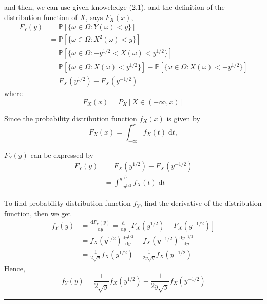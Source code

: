 \documentclass[twoside]{article}
\theoremstyle{definition}
\theoremstyle{remark}
\newenvironment{sol}{{\bf Solution:}}{\hfill\rule{2mm}{2mm}}
\begin{document}
\begin{enumerate}
\begin{sol}
    and then, we can use given knoweledge (2.1), and the definition of the
    distribution function of $X$, says $F_X(x)$,
    \begin{equation}
      \begin{split}
        F_Y(y)
        &= \mathbb{P}[{\{\omega \in \Omega : Y(\omega) < y \}}] \\
        &= \mathbb{P}[{\{\omega \in \Omega : X^2(\omega) < y \}}] \\
        &= \mathbb{P}[{\{\omega \in \Omega : -y^{1/2} < X(\omega) < y^{1/2} \}}] \\
        &= \mathbb{P}[{\{\omega \in \Omega : X(\omega) <  y^{1/2} \}}]
        -  \mathbb{P}[{\{\omega \in \Omega : X(\omega) < -y^{1/2} \}}] \\
        &= F_X(y^{1/2}) - F_X(y^{-1/2})
      \end{split}
    \end{equation}
    where
    \begin{equation}
      F_X(x) = P_X[X \in (-\infty, x)]
    \end{equation}

    Since the probability distribution function $f_X(x)$ is given by
    \begin{equation}
      F_X(x) = \int_{-\infty}^{x} f_X(t) \;\mathrm{d}t,
    \end{equation}

    $F_Y(y)$ can be expressed by
    \begin{equation}
      \begin{split}
        F_Y(y)
        &= F_X(y^{1/2}) - F_X(y^{-1/2}) \\
        &= \int_{-y^{1/2}}^{y^{1/2}} f_X(t) \;\mathrm{d}t
      \end{split}
    \end{equation}

    To find probability distribution function $f_Y$, find the derivative of the
    distribution function, then we get
    \begin{equation}
      \begin{split}
        f_Y(y)
        &= \frac{\mathrm{d}F_Y(y)}{\mathrm{d}y}
         = \frac{\mathrm{d}}{\mathrm{d}y} \left[ F_X(y^{1/2}) - F_X(y^{-1/2}) \right] \\
        &= f_X(y^{1/2}) \frac{\mathrm{d}y^{1/2}}{\mathrm{d}y}
         - f_X(y^{-1/2}) \frac{\mathrm{d}y^{-1/2}}{\mathrm{d}y} \\
        &= \frac{1}{2\sqrt{y}} f_X(y^{1/2}) + \frac{1}{2y\sqrt{y}} f_X(y^{-1/2})
      \end{split}
    \end{equation}
    Hence,
    \begin{equation}
      f_Y(y) = \frac{1}{2\sqrt{y}} f_X(y^{1/2}) + \frac{1}{2y\sqrt{y}} f_X(y^{-1/2})
    \end{equation}
  \end{sol}


\end{enumerate}
\end{document}
